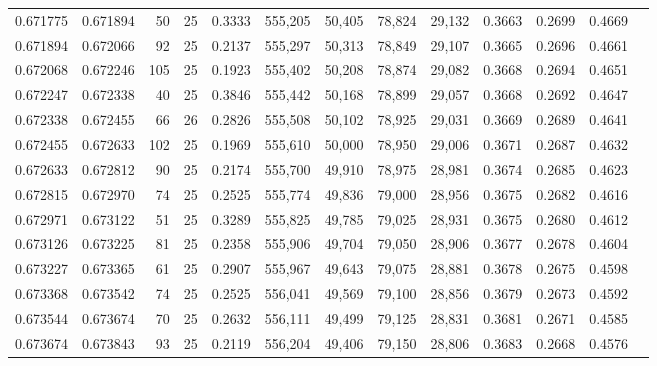 \begin{tabular}{rrrrrrrrrrrrr}
0.671775 & 0.671894 &    50 &  25 &                                     0.3333 & 555,205 &  50,405 &  78,824 &  29,132 & 0.3663 & 0.2699 & 0.4669 \\
0.671894 & 0.672066 &    92 &  25 &                                     0.2137 & 555,297 &  50,313 &  78,849 &  29,107 & 0.3665 & 0.2696 & 0.4661 \\
0.672068 & 0.672246 &   105 &  25 &                                     0.1923 & 555,402 &  50,208 &  78,874 &  29,082 & 0.3668 & 0.2694 & 0.4651 \\
0.672247 & 0.672338 &    40 &  25 &                                     0.3846 & 555,442 &  50,168 &  78,899 &  29,057 & 0.3668 & 0.2692 & 0.4647 \\
0.672338 & 0.672455 &    66 &  26 &                                     0.2826 & 555,508 &  50,102 &  78,925 &  29,031 & 0.3669 & 0.2689 & 0.4641 \\
0.672455 & 0.672633 &   102 &  25 &                                     0.1969 & 555,610 &  50,000 &  78,950 &  29,006 & 0.3671 & 0.2687 & 0.4632 \\
0.672633 & 0.672812 &    90 &  25 &                                     0.2174 & 555,700 &  49,910 &  78,975 &  28,981 & 0.3674 & 0.2685 & 0.4623 \\
0.672815 & 0.672970 &    74 &  25 &                                     0.2525 & 555,774 &  49,836 &  79,000 &  28,956 & 0.3675 & 0.2682 & 0.4616 \\
0.672971 & 0.673122 &    51 &  25 &                                     0.3289 & 555,825 &  49,785 &  79,025 &  28,931 & 0.3675 & 0.2680 & 0.4612 \\
0.673126 & 0.673225 &    81 &  25 &                                     0.2358 & 555,906 &  49,704 &  79,050 &  28,906 & 0.3677 & 0.2678 & 0.4604 \\
0.673227 & 0.673365 &    61 &  25 &                                     0.2907 & 555,967 &  49,643 &  79,075 &  28,881 & 0.3678 & 0.2675 & 0.4598 \\
0.673368 & 0.673542 &    74 &  25 &                                     0.2525 & 556,041 &  49,569 &  79,100 &  28,856 & 0.3679 & 0.2673 & 0.4592 \\
0.673544 & 0.673674 &    70 &  25 &                                     0.2632 & 556,111 &  49,499 &  79,125 &  28,831 & 0.3681 & 0.2671 & 0.4585 \\
0.673674 & 0.673843 &    93 &  25 &                                     0.2119 & 556,204 &  49,406 &  79,150 &  28,806 & 0.3683 & 0.2668 & 0.4576 \\

\end{tabular}
